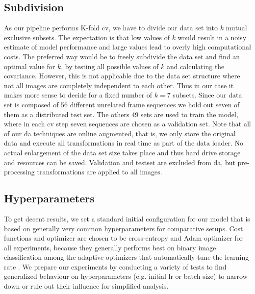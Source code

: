 \subsection{Subdivision}

As our pipeline performs K-fold \acrshort{cv}, we have to divide our data set into \( k \) mutual exclusive subsets. The expectation is that low values of \( k \) would result in a noisy estimate of model performance and large values lead to overly high computational costs. The preferred way would be to freely subdivide the data set and find an optimal value for \( k \), by testing all possible values of \( k \) and calculating the covariance. However, this is not applicable due to the data set structure where not all images are completely independent to each other. Thus in our case it makes more sense to decide for a fixed number of \( k = 7 \) subsets. Since our data set is composed of 56 different unrelated frame sequences we hold out seven of them as a distributed test set. The others 49 sets are used to train the model, where in each \acrshort{cv} step seven sequences are chosen as a validation set. Note that all of our \acrshort{da} techniques are online augmented, that is, we only store the original data and execute all transformations in real time as part of the data loader. No actual enlargement of the data set size takes place and thus hard drive storage and resources can be saved. Validation and testset are excluded from \acrshort{da}, but pre-processing transformations are applied to all images.

\subsection{Hyperparameters}

To get decent results, we set a standard initial configuration for our model that is based on generally very common hyperparameters for comparative setups. Cost functions and optimizer are chosen to be cross-entropy and Adam optimizer for all experiments, because they generally performs best on binary image classification  among the adaptive optimizers that automatically tune the \gls{learning-rate} \cite{VaniS..2019}. We prepare our experiments by conducting a variety of tests to find generalized behaviour on hyperparameters (e.g. initial lr or batch size) to narrow down or rule out their influence for simplified analysis.

